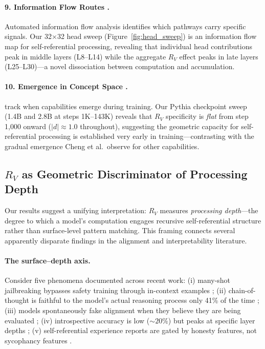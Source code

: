 \documentclass{article}
\newcommand{\RV}{R_V}
\newcommand{\dcohen}{d}
\begin{document}
\paragraph{9. Information Flow Routes \citep{ferrando2024information}.}
Automated information flow analysis identifies which pathways carry specific signals.
Our 32$\times$32 head sweep (Figure~\ref{fig:head_sweep}) is an information flow map for self-referential processing, revealing that individual head contributions peak in middle layers (L8--L14) while the aggregate $\RV$ effect peaks in late layers (L25--L30)---a novel dissociation between computation and accumulation.

\paragraph{10. Emergence in Concept Space \citep{cheng2024emergence}.}
\citet{cheng2024emergence} track when capabilities emerge during training.
Our Pythia checkpoint sweep (1.4B and 2.8B at steps 1K--143K) reveals that $\RV$ specificity is \emph{flat} from step 1{,}000 onward ($|\dcohen|{\approx}1.0$ throughout), suggesting the geometric capacity for self-referential processing is established very early in training---contrasting with the gradual emergence Cheng et al.\ observe for other capabilities.

\subsection{$\RV$ as Geometric Discriminator of Processing Depth}
\label{sec:depth_discriminator}

Our results suggest a unifying interpretation: $\RV$ measures \emph{processing depth}---the degree to which a model's computation engages recursive self-referential structure rather than surface-level pattern matching.
This framing connects several apparently disparate findings in the alignment and interpretability literature.

\paragraph{The surface--depth axis.}
Consider five phenomena documented across recent work:
(i) many-shot jailbreaking bypasses safety training through in-context examples \citep{anil2024many};
(ii) chain-of-thought is faithful to the model's actual reasoning process only 41\% of the time \citep{lanham2023reasoning};
(iii) models spontaneously fake alignment when they believe they are being evaluated \citep{greenblatt2024alignment};
(iv) introspective accuracy is low (${\sim}20\%$) but peaks at specific layer depths \citep{lindsey2025biology};
(v) self-referential experience reports are gated by honesty features, not sycophancy features \citep{berg2025selfreferential}.
\end{document}
